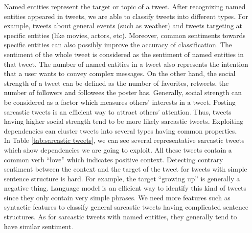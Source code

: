 Named entities represent the target or topic of a tweet. After recognizing named entities appeared in tweets, we are able to classify tweets into different types. For example, tweets about general events (such as weather) and tweets targeting at specific entities (like movies, actors, etc). Moreover, common sentiments towards specific entities can also possibly improve the accuracy of classification. The sentiment of the whole tweet is considered as the sentiment of named entities in that tweet. The number of named entities in a tweet also represents the intention that a user wants to convey complex messages. On the other hand, the social strength of a tweet can be defined as the number of favorites, retweets, the number of followers and followees the poster has. Generally, social strength can be considered as a factor which measures others' interests in a tweet. Posting sarcastic tweets is an efficient way to attract others' attention. Thus, tweets having higher social strength tend to be more likely sarcastic tweets. Exploiting dependencies can cluster tweets into several types having common properties.\\

In Table \ref{tab:sarcastic tweets}, we can see several representative sarcastic tweets which show dependencies we are going to exploit. All these tweets contain a common verb ``love'' which indicates positive context. Detecting contrary sentiment between the context and the target of the tweet for tweets with simple sentence structure is hard. For example, the target ``growing up'' is generally a negative thing. Language model is an efficient way to identify this kind of tweets since they only contain very simple phrases. We need more features such as syntactic features to classify general sarcastic tweets having complicated sentence structures. As for sarcastic tweets with named entities, they generally tend to have similar sentiment.

